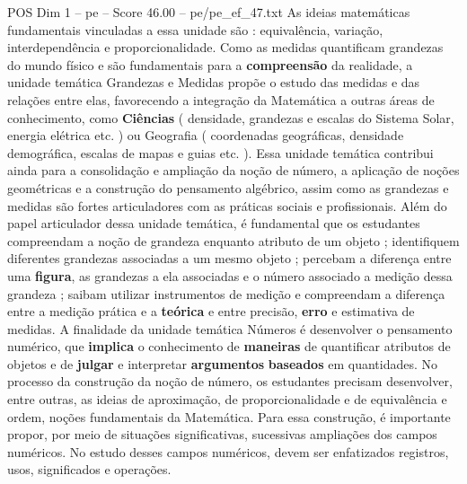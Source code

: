 \begin{textsample}{POS Dim 1 – pe – Score 46.00 – pe/pe\_ef\_47.txt}
As ideias matemáticas fundamentais vinculadas a essa unidade são : equivalência, variação, interdependência e proporcionalidade.
Como as medidas quantificam grandezas do mundo físico e são fundamentais para a \textbf{compreensão} da realidade, a unidade temática Grandezas e Medidas propõe o estudo das medidas e das relações entre elas, favorecendo a integração da Matemática a outras áreas de conhecimento, como \textbf{Ciências} ( densidade, grandezas e escalas do Sistema Solar, energia elétrica etc. ) ou Geografia ( coordenadas geográficas, densidade demográfica, escalas de mapas e guias etc. ).
Essa unidade temática contribui ainda para a consolidação e ampliação da noção de número, a aplicação de noções geométricas e a construção do pensamento algébrico, assim como as grandezas e medidas são fortes articuladores com as práticas sociais e profissionais.
Além do papel articulador dessa unidade temática, é fundamental que os estudantes compreendam a noção de grandeza enquanto atributo de um objeto ; identifiquem diferentes grandezas associadas a um mesmo objeto ; percebam a diferença entre uma \textbf{figura}, as grandezas a ela associadas e o número associado a medição dessa grandeza ; saibam utilizar instrumentos de medição e compreendam a diferença entre a medição prática e a \textbf{teórica} e entre precisão, \textbf{erro} e estimativa de medidas.
A finalidade da unidade temática Números é desenvolver o pensamento numérico, que \textbf{implica} o conhecimento de \textbf{maneiras} de quantificar atributos de objetos e de \textbf{julgar} e interpretar \textbf{argumentos} \textbf{baseados} em quantidades.
No processo da construção da noção de número, os estudantes precisam desenvolver, entre outras, as ideias de aproximação, de proporcionalidade e de equivalência e ordem, noções fundamentais da Matemática.
Para essa construção, é importante propor, por meio de situações significativas, sucessivas ampliações dos campos numéricos.
No estudo desses campos numéricos, devem ser enfatizados registros, usos, significados e operações.

\end{textsample}
